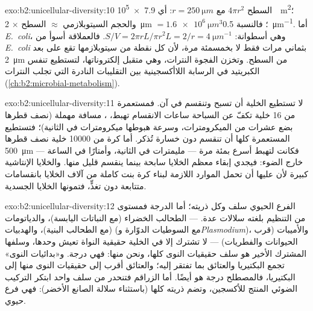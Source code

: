 \begin{solution}{exo:b2:unicellular-diversity:10}
السطح $4\pi r^2$ مع $r = \qty{250}{\micro m}$: أي \qty{7.9e5}{\micro
m^2}؛ والحجم السيتوبلازمي $\approx$ السطح $\times$ \qty{2}{\micro m}
$= \qty{1.6e6}{\micro m^3}$؛ فالنسبة \qty{0.5}{\micro m^{-1}}. أما
\emph{E.~coli}، وهي أسطوانة: $S/V = 2\pi r L/\pi r^2 L = 2/r =
\qty{4}{\micro m^{-1}}$. فالعملاقة أسوأ من \emph{E.~coli} بثماني
مرات فقط لا بخمسمئة مرة، لأن كل نقطة من سيتوبلازمها تقع على بعد
\qty{2}{\micro m} من السطح. وتخزن الفجوة النترات، وهي متقبل
إلكتروناتها، لتستطيع تنفس الكبريتيد في الرسابة اللاأكسجينية بين
التقليبات النادرة التي تجلب النترات
(\cref{ch:b2:microbial-metabolism}).
\end{solution}

\begin{solution}{exo:b2:unicellular-diversity:11}
لا تستطيع الخلية أن تسبح وتنقسم في آن. فمستعمرة من 16 خلية تكفّ عن
السباحة ساعات الانقسام تهبط، ، مسافة مهملة (نصف قطرها
بضع عشرات من الميكرومترات، وسرعة هبوطها ميكرومترات في الثانية)؛
فتستطيع المستعمرة كلها أن تنقسم دون خسارة تُذكر. أما كرة من
\num{10000} خلية نصف قطرها \qty{500}{\micro m} فكانت لتهبط أسرع
بمئة مرة --- مليمترات في الثانية، وأمتارًا في الساعة --- خارج
الضوء: فيجدي إبقاء معظم الخلايا سابحة بينما ينقسم قليل منها.
والخلايا الإنتاشية كبيرة لأن عليها أن تحمل الموارد اللازمة لبناء
كرة بنت كاملة من آلاف الخلايا بانقسامات متتابعة دون تغذٍّ، فتمونها
الخلايا الجسدية.
\end{solution}

\begin{solution}{exo:b2:unicellular-diversity:12}
الفرع الحيوي سلف وكل ذريته؛ أما الدرجة فمستوى من التنظيم بلغته
سلالات عدة.  --- الطحالب الخضراء (مع النباتات اليابسة)،
والدياتومات (مع الطحالب البنية)، والهدبيات (مع السوطيات الدوّارة
و\emph{Plasmodium})، والأميبات (قرب الحيوانات والفطريات) --- لا
تشترك إلا في الخلية حقيقية النواة تعيش وحدها، وسلفها المشترك الأخير
هو سلف حقيقيات النوى كلها، ونحن منها: فهي درجة. و«بدائيات النوى»
تجمع البكتيريا والعتائق بما تفتقر إليه؛ والعتائق أقرب إلى حقيقيات
النوى منها إلى البكتيريا، فالمصطلح درجة هو أيضًا. أما الزراقم
فتنحدر من سلف واحد ابتكر التركيب الضوئي المنتج للأكسجين، وتضم
ذريته كلها (باستثناء سلالة الصانع الأخضر): فهي فرع حيوي.
\end{solution}

